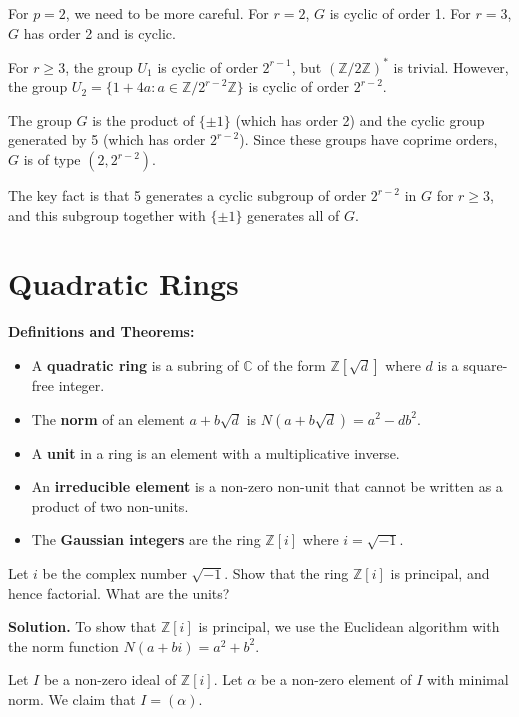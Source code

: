 For $p = 2$, we need to be more careful. For $r = 2$, $G$ is cyclic of order 1. For $r = 3$, $G$ has order 2 and is cyclic.

For $r \geq 3$, the group $U_1$ is cyclic of order $2^{r-1}$, but $(\mathbb{Z}/2\mathbb{Z})^*$ is trivial. However, the group $U_2 = \{1 + 4a : a \in \mathbb{Z}/2^{r-2}\mathbb{Z}\}$ is cyclic of order $2^{r-2}$.

The group $G$ is the product of $\{\pm 1\}$ (which has order 2) and the cyclic group generated by 5 (which has order $2^{r-2}$). Since these groups have coprime orders, $G$ is of type $(2, 2^{r-2})$.

The key fact is that 5 generates a cyclic subgroup of order $2^{r-2}$ in $G$ for $r \geq 3$, and this subgroup together with $\{\pm 1\}$ generates all of $G$.

\section{Quadratic Rings}

\noindent\textbf{Definitions and Theorems:}
\begin{itemize}
\item A \textbf{quadratic ring} is a subring of $\mathbb{C}$ of the form $\mathbb{Z}[\sqrt{d}]$ where $d$ is a square-free integer.
\item The \textbf{norm} of an element $a + b\sqrt{d}$ is $N(a + b\sqrt{d}) = a^2 - db^2$.
\item A \textbf{unit} in a ring is an element with a multiplicative inverse.
\item An \textbf{irreducible element} is a non-zero non-unit that cannot be written as a product of two non-units.
\item The \textbf{Gaussian integers} are the ring $\mathbb{Z}[i]$ where $i = \sqrt{-1}$.
\end{itemize}

\begin{problembox}
Let $i$ be the complex number $\sqrt{-1}$. Show that the ring $\mathbb{Z}[i]$ is principal, and hence factorial. What are the units?
\end{problembox}

\noindent\textbf{Solution.}
To show that $\mathbb{Z}[i]$ is principal, we use the Euclidean algorithm with the norm function $N(a + bi) = a^2 + b^2$.

Let $I$ be a non-zero ideal of $\mathbb{Z}[i]$. Let $\alpha$ be a non-zero element of $I$ with minimal norm. We claim that $I = (\alpha)$.

